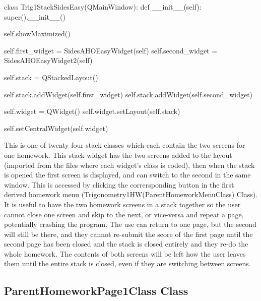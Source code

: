 \begin{python}
class Trig1StackSidesEasy(QMainWindow):
    def __init__(self):
        super().__init__()

        self.showMaximized()

        self.first_widget = SidesAHOEasyWidget(self)
        self.second_widget = SidesAHOEasyWidget2(self)

        self.stack = QStackedLayout()

        self.stack.addWidget(self.first_widget)
        self.stack.addWidget(self.second_widget)

        self.widget = QWidget()
        self.widget.setLayout(self.stack)

        self.setCentralWidget(self.widget)
\end{python}

This is one of twenty four stack classes which each contain the two screens for one homework. This stack widget has the two screens added to the layout (imported from the files where each widget's class is coded), then when the stack is opened the first screen is displayed, and can switch to the second in the same window. This is accessed by clicking the corrersponding button in the first derived homework menu (Trigonometry1HW(ParentHomeworkMenuClass) Class). It is useful to have the two homework screens in a stack together so the user cannot close one screen and skip to the next, or vice-versa and repeat a page, potentially crashing the program. The use can return to one page, but the second will still be there, and they cannot re-submit the score of the first page until the second page has been closed and the stack is closed entirely and they re-do the whole homework. The contents of both screens will be left how the user leaves them until the entire stack is closed, even if they are switching between screens.

\subsection{ParentHomeworkPage1Class Class}

